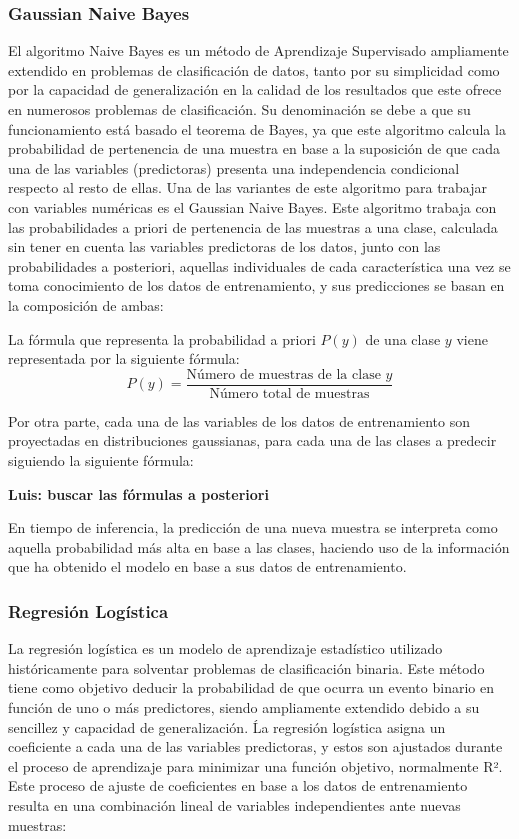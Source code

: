 \documentclass{uathesis-es}
\begin{document}
\subsubsection*{Gaussian Naive Bayes}

El algoritmo Naive Bayes es un método de Aprendizaje Supervisado ampliamente extendido en problemas de clasificación de datos, tanto por su simplicidad como por la capacidad de generalización en la calidad de los resultados que este ofrece en numerosos problemas de clasificación. Su denominación se debe a que su funcionamiento está basado el teorema de Bayes, ya que este algoritmo calcula la probabilidad de pertenencia de una muestra en base a la suposición de que cada una de las variables (predictoras) presenta una independencia condicional respecto al resto de ellas. Una de las variantes de este algoritmo para trabajar con variables numéricas es el Gaussian Naive Bayes. Este algoritmo trabaja con las probabilidades a priori de pertenencia de las muestras a una clase, calculada sin tener en cuenta las variables predictoras de los datos, junto con las probabilidades a posteriori, aquellas individuales de cada característica una vez se toma conocimiento de los datos de entrenamiento, y sus predicciones se basan en la composición de ambas:

La fórmula que representa la probabilidad a priori $P(y)$ de una clase $y$ viene representada por la siguiente fórmula:\\

\[
P(y) = \frac{\text{Número de muestras de la clase } y}{\text{Número total de muestras}}
\]

Por otra parte, cada una de las variables de los datos de entrenamiento son proyectadas en distribuciones gaussianas, para cada una de las clases a predecir siguiendo la siguiente fórmula:

\textbf{Luis: buscar las fórmulas a posteriori}

En tiempo de inferencia, la predicción de una nueva muestra se interpreta como aquella probabilidad más alta en base a las clases, haciendo uso de la información que ha obtenido el modelo en base a sus datos de entrenamiento.


\subsubsection*{Regresión Logística}

La regresión logística es un modelo de aprendizaje estadístico utilizado históricamente para solventar problemas de clasificación binaria. Este método tiene como objetivo deducir la probabilidad de que ocurra un evento binario en función de uno o más predictores, siendo ampliamente extendido debido a su sencillez y capacidad de generalización. Ĺa regresión logística asigna un coeficiente a cada una de las variables predictoras, y estos son ajustados durante el proceso de aprendizaje para minimizar una función objetivo, normalmente R². Este proceso de ajuste de coeficientes en base a los datos de entrenamiento resulta en una combinación lineal de variables independientes ante nuevas muestras:
\end{document}
